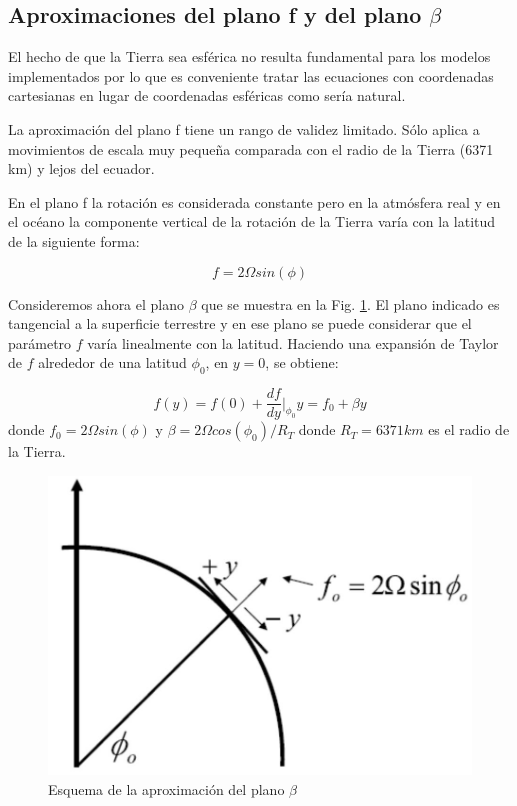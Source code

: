 \documentclass[12pt,dvipsnames]{exam}
\begin{document}
\subsection{Aproximaciones del plano f y del plano $\beta$}

El hecho de que la Tierra sea esférica no resulta fundamental para los modelos implementados por lo que es conveniente tratar las ecuaciones con coordenadas cartesianas en lugar de coordenadas esféricas como sería natural.


La aproximación del plano f tiene un rango de validez limitado. Sólo aplica a movimientos de escala muy pequeña comparada con el radio de la Tierra (6371 km) y lejos del ecuador.

En el plano f la rotación es considerada constante pero en la atmósfera real y en el océano la componente vertical de la rotación de la Tierra varía con la latitud de la siguiente forma:

\begin{equation*}
    f = 2 \Omega sin(\phi)
\end{equation*}

Consideremos ahora el plano $\beta$ que se muestra en la Fig. \ref{bee}. El plano indicado es tangencial a la superficie terrestre y en ese plano se puede considerar que el parámetro $f$ varía linealmente con la latitud. Haciendo una expansión de Taylor de $f$ alrededor de una latitud $\phi_{0}$, en $y=0$, se obtiene:

\begin{equation*}
    f(y) = f(0) + \frac{d f}{d y } \rvert_{\phi_{0}} y = f_{0} + \beta y
\end{equation*}
donde $f_{0} = 2 \Omega sin(\phi)$ y $\beta = 2 \Omega cos(\phi_{0})/R_{T}$ donde $R_{T} = 6371 km$ es el radio de la Tierra.

\begin{figure}[H]
\centering
\includegraphics[scale=0.4]{bet.jpeg}
\caption{Esquema de la aproximación del plano $\beta$}
\label{bee}
\end{figure}
\end{document}
